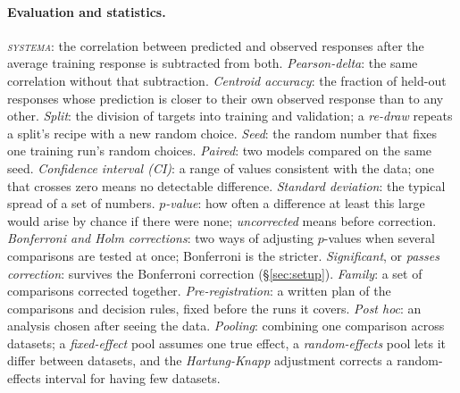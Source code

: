 \documentclass{article}
\begin{document}
\paragraph{Evaluation and statistics.} \emph{\textsc{systema}}: the correlation between predicted and
observed responses after the average training response is subtracted from both. \emph{Pearson-delta}: the
same correlation without that subtraction. \emph{Centroid accuracy}: the fraction of held-out responses
whose prediction is closer to their own observed response than to any other. \emph{Split}: the division of
targets into training and validation; a \emph{re-draw} repeats a split's recipe with a new random choice.
\emph{Seed}: the random number that fixes one training run's random choices. \emph{Paired}: two models
compared on the same seed. \emph{Confidence interval (CI)}: a range of values consistent with the data; one
that crosses zero means no detectable difference. \emph{Standard deviation}: the typical spread of a set of
numbers. \emph{$p$-value}: how often a difference at least this large would arise by chance if there were
none; \emph{uncorrected} means before correction. \emph{Bonferroni and Holm corrections}: two ways of
adjusting $p$-values when several comparisons are tested at once; Bonferroni is the stricter.
\emph{Significant}, or \emph{passes correction}: survives the Bonferroni correction (\S\ref{sec:setup}).
\emph{Family}: a set of comparisons corrected together. \emph{Pre-registration}: a written plan of the
comparisons and decision rules, fixed before the runs it covers. \emph{Post hoc}: an analysis chosen after
seeing the data. \emph{Pooling}: combining one comparison across datasets; a \emph{fixed-effect} pool
assumes one true effect, a \emph{random-effects} pool lets it differ between datasets, and the
\emph{Hartung-Knapp} adjustment corrects a random-effects interval for having few datasets.
\end{document}
